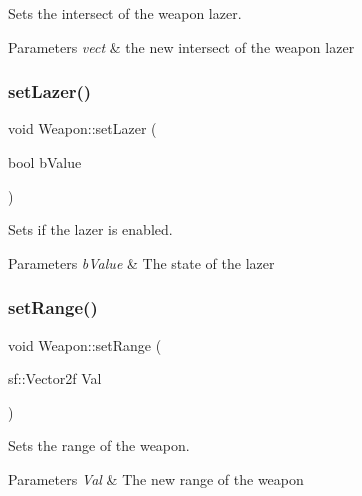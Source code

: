 Sets the intersect of the weapon lazer. 


\begin{DoxyParams}{Parameters}
{\em vect} & the new intersect of the weapon lazer \\
\hline
\end{DoxyParams}
\mbox{\label{class_weapon_afaa4ee35fb8628f650370c032990149e}} 
\subsubsection{\texorpdfstring{set\+Lazer()}{setLazer()}}
{\footnotesize\ttfamily void Weapon\+::set\+Lazer (\begin{DoxyParamCaption}\item[{bool}]{b\+Value }\end{DoxyParamCaption})}



Sets if the lazer is enabled. 


\begin{DoxyParams}{Parameters}
{\em b\+Value} & The state of the lazer \\
\hline
\end{DoxyParams}
\mbox{\label{class_weapon_aedbf064d6ec5f3e9f53f58b68963b510}} 
\subsubsection{\texorpdfstring{set\+Range()}{setRange()}}
{\footnotesize\ttfamily void Weapon\+::set\+Range (\begin{DoxyParamCaption}\item[{sf\+::\+Vector2f}]{Val }\end{DoxyParamCaption})}



Sets the range of the weapon. 


\begin{DoxyParams}{Parameters}
{\em Val} & The new range of the weapon \\
\hline
\end{DoxyParams}
\mbox{\label{class_weapon_a30e95664d9571a9e0b614e662466933e}} 

